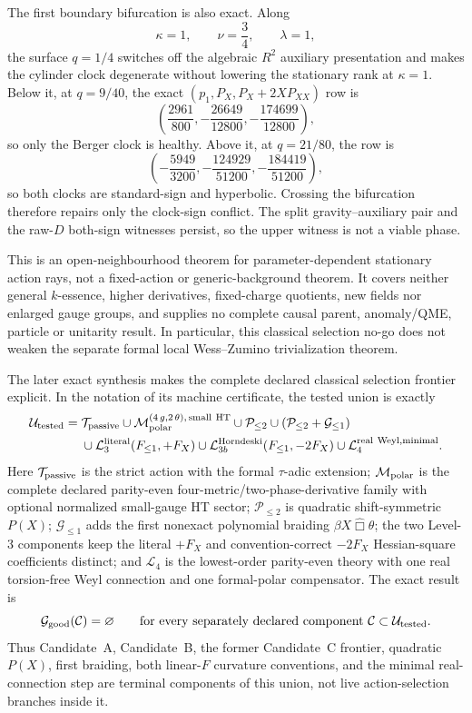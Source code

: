 \documentclass[11pt]{article}
\theoremstyle{definition}
\theoremstyle{remark}
\begin{document}
The first boundary bifurcation is also exact.  Along
\[
 \kappa=1,\qquad \nu=\frac34,\qquad \lambda=1,
\]
the surface $q=1/4$ switches off the algebraic $R^2$ auxiliary presentation
and makes the cylinder clock degenerate without lowering the stationary rank
at $\kappa=1$.  Below it, at $q=9/40$, the exact
$(p_1,P_X,P_X+2XP_{XX})$ row is
\[
 \left(\frac{2961}{800},-\frac{26649}{12800},
       -\frac{174699}{12800}\right),
\]
so only the Berger clock is healthy.  Above it, at $q=21/80$, the row is
\[
 \left(-\frac{5949}{3200},-\frac{124929}{51200},
       -\frac{184419}{51200}\right),
\]
so both clocks are standard-sign and hyperbolic.  Crossing the bifurcation
therefore repairs only the clock-sign conflict.  The split
gravity--auxiliary pair and the raw-$D$ both-sign witnesses persist, so the
upper witness is not a viable phase.

This is an open-neighbourhood theorem for parameter-dependent stationary
action rays, not a fixed-action or generic-background theorem.  It covers
neither general $k$-essence, higher derivatives, fixed-charge quotients, new
fields nor enlarged gauge groups, and supplies no complete causal parent,
anomaly/QME, particle or unitarity result.  In particular, this classical
selection no-go does not weaken the separate formal local Wess--Zumino
trivialization theorem.

The later exact synthesis makes the complete declared classical selection
frontier explicit.  In the notation of its machine certificate, the tested
union is exactly
\begin{align*}
 \mathcal U_{\rm tested}={}&
 \mathcal T_{\rm passive}
 \cup \mathcal M_{\rm polar}^{(4\,g,2\,\theta),\,\mathrm{small\ HT}}
 \cup \mathcal P_{\leq2}
 \cup (\mathcal P_{\leq2}+\mathcal G_{\leq1})\\
 &\cup \mathcal L_{3}^{\rm literal}(F_{\leq1},+F_X)
 \cup \mathcal L_{3b}^{\rm Horndeski}(F_{\leq1},-2F_X)
 \cup \mathcal L_{4}^{\rm real\ Weyl,\mathrm{minimal}}.
\end{align*}
Here $\mathcal T_{\rm passive}$ is the strict action with the formal
$\tau$-adic extension; $\mathcal M_{\rm polar}$ is the complete declared
parity-even four-metric/two-phase-derivative family with optional normalized
small-gauge HT sector; $\mathcal P_{\leq2}$ is quadratic shift-symmetric
$P(X)$; $\mathcal G_{\leq1}$ adds the first nonexact polynomial braiding
$\beta X\widehat\Box\theta$; the two Level-3 components keep the literal
$+F_X$ and convention-correct $-2F_X$ Hessian-square coefficients distinct;
and $\mathcal L_4$ is the lowest-order parity-even theory with one real
torsion-free Weyl connection and one formal-polar compensator.  The exact
result is
\[
 \mathcal G_{\rm good}(\mathcal C)=\varnothing
 \qquad\text{for every separately declared component }
 \mathcal C\subset\mathcal U_{\rm tested}.
\]
Thus Candidate~A, Candidate~B, the former Candidate~C frontier, quadratic
$P(X)$, first braiding, both linear-$F$ curvature conventions, and the
minimal real-connection step are terminal components of this union, not live
action-selection branches inside it.
\end{document}
